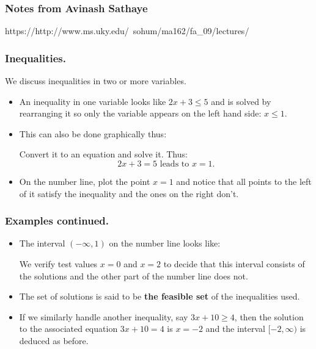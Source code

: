  \begin{frame}[fragile] \frametitle{Notes from Avinash Sathaye}
https://http://www.ms.uky.edu/~sohum/ma162/fa\_09/lectures/
\end{frame}

\begin{frame} %

  \frametitle{Inequalities. }
  We discuss inequalities in two or more variables.
                                               

 
  \begin{itemize}%

\item An inequality in one variable looks like $2x+3\le 5$ and is solved by
  rearranging it so only the variable appears on the left hand side:
  $x\le 1$.   
   
\item This can also be done graphically thus:

Convert it to an equation and solve it. Thus:
$$2x+3=5 \mbox{ leads to } x=1.$$

\item On the number line,  plot the point $ x = 1$  
and notice that all points to the left of it satisfy the inequality 
and the ones on the right don't.
\end{itemize}

\end{frame}



\begin{frame}%
  \frametitle{Examples continued.}
  \begin{itemize}%

\item The interval $(-\infty,1)$ on the number line looks like:
\centerline{}

We verify test values $x=0$ and $x=2$ to decide that this interval
consists of the solutions and the other part of the number line does
not.

\item The set of solutions is said to be {\bf the feasible set }of the
inequalities used.

\item If we similarly handle another inequality, say $3x+10\ge 4$, then
the solution to the associated equation $3x+10=4$ is $x=-2$ and the
interval $[-2,\infty)$ is deduced as before.

\centerline{}


\end{itemize}
\end{frame}

